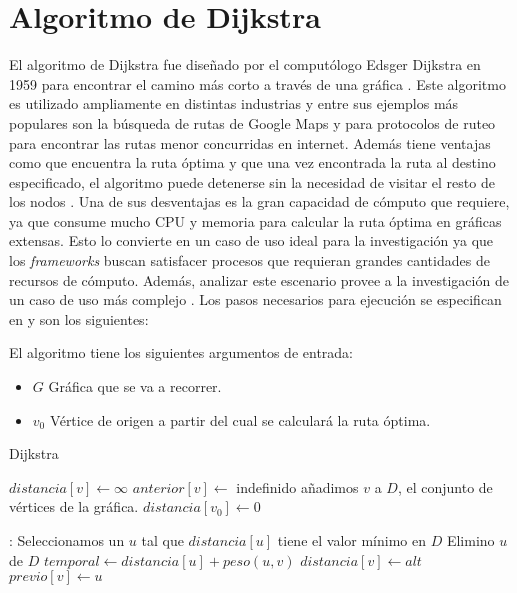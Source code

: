 \section{Algoritmo de Dijkstra}


El algoritmo de Dijkstra fue diseñado por el computólogo Edsger Dijkstra en 1959 para encontrar el camino más corto a través de una gráfica \cite{dijkstraexplicado}. Este algoritmo es utilizado ampliamente en distintas industrias y entre sus ejemplos más populares son la búsqueda de rutas de Google Maps y para protocolos de ruteo para encontrar las rutas menor concurridas en internet. Además tiene ventajas como que encuentra la ruta óptima y que una vez encontrada la ruta al destino especificado, el algoritmo puede detenerse sin la necesidad de visitar el resto de los nodos \cite{dijkstrabellford}. Una de sus desventajas es la gran capacidad de cómputo que requiere, ya que consume mucho CPU y memoria para calcular la ruta óptima en gráficas extensas. Esto lo convierte en un caso de uso ideal para la investigación ya que los \textit{frameworks} buscan satisfacer procesos que requieran grandes cantidades de recursos de cómputo. Además, analizar este escenario provee a la investigación de un caso de uso más complejo \cite{dijkstrabellford}. Los pasos necesarios para ejecución se especifican en \cite{dijkstrabellford} y son los siguientes:

El algoritmo tiene los siguientes argumentos de entrada:
\begin{itemize}
	\item $G$ Gráfica que se va a recorrer.
	\item $v_{0}$ Vértice de origen a partir del cual se calculará la ruta óptima.
\end{itemize}

\begin{algorithm}[H]
\caption{Dijkstra}\label{Dijkstra}
\begin{algorithmic}[1]
	\State $distancia[v] \gets \infty$
	\State $anterior[v] \gets $ indefinido
	\State añadimos $v$ a $D$, el conjunto de vértices de la gráfica.
\EndFor
\State $distancia[v_{0}] \gets 0$

:
	\State Seleccionamos un $u$ tal que $distancia[u]$ tiene el valor mínimo en $D$
	\State Elimino $u$ de $D$
		\State $temporal \gets distancia[u] + peso(u, v)$
			\State $distancia[v] \gets alt$
			\State $previo[v] \gets u$		
		\EndIf
	\EndFor
\EndWhile
\EndProcedure
\end{algorithmic}
\end{algorithm}

